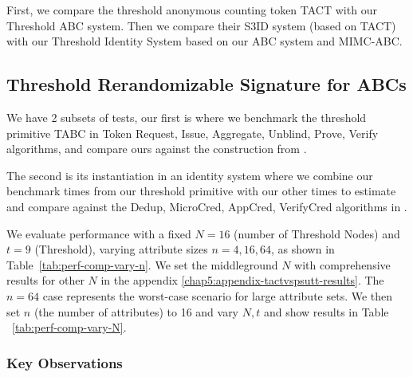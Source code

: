 First, we compare the threshold anonymous counting token TACT with our Threshold ABC system. 
Then we compare their S3ID system (based on TACT) with our Threshold Identity System based on our ABC system and MIMC-ABC. 



\subsection{Threshold Rerandomizable Signature for ABCs}




\label{sec:threshold-performance-tact}
We have 2 subsets of tests, our first is where we benchmark the threshold primitive TABC in Token Request, Issue, Aggregate, Unblind, Prove, Verify algorithms, and compare ours against the construction from \cite{rabaninejad_attribute-based_2024}.

The second is its instantiation in an identity system where we combine our benchmark times from our threshold primitive with our other times to estimate and compare against the Dedup, MicroCred, AppCred, VerifyCred algorithms in \cite{rabaninejad_attribute-based_2024}.

We evaluate performance with a fixed $N = 16$ (number of Threshold Nodes) and $t = 9$ (Threshold), varying attribute sizes $n = 4, 16, 64$, as shown in Table~\ref{tab:perf-comp-vary-n}. We set the middleground $N$ with comprehensive results for other $N$ in the appendix \ref{chap5:appendix-tactvspsutt-results}. The $n = 64$ case represents the worst-case scenario for large attribute sets. We then set $n$ (the number of attributes) to 16 and vary $N, t$ and show results in Table ~\ref{tab:perf-comp-vary-N}.

\subsubsection{Key Observations}

